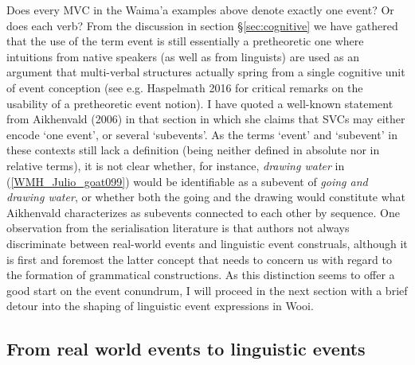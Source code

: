 Does every MVC in the Waima'a examples above denote exactly one event? Or does each verb? From the discussion in section §\ref{sec:cognitive} we have gathered that the use of the term event is still essentially a pretheoretic one where intuitions from native speakers (as well as from linguists) are used as an argument that multi-verbal structures actually spring from a single cognitive unit of event conception (see e.g. Haspelmath 2016 for critical remarks on the usability of a pretheoretic event notion). I have quoted a well-known statement from Aikhenvald (2006) in that section in which she claims that SVCs may either encode `one event', or several `subevents'. As the terms `event' and `subevent' in these contexts still lack a definition (being neither defined in absolute nor in relative terms), it is not clear whether, for instance, \textit{drawing water} in (\ref{WMH_Julio_goat099}) would be identifiable as a subevent of \textit{going and drawing water}, or whether both the going and the drawing would constitute what Aikhenvald characterizes as subevents connected to each other by sequence. One observation from the serialisation literature is that authors not always discriminate between real-world events and linguistic event construals, although it is first and foremost the latter concept that needs to concern us with regard to the formation of grammatical constructions. As this distinction seems to offer a good start on the event conundrum, I will proceed in the next section with a brief detour into the shaping of linguistic event expressions in Wooi.

\subsection{From real world events to linguistic events}

